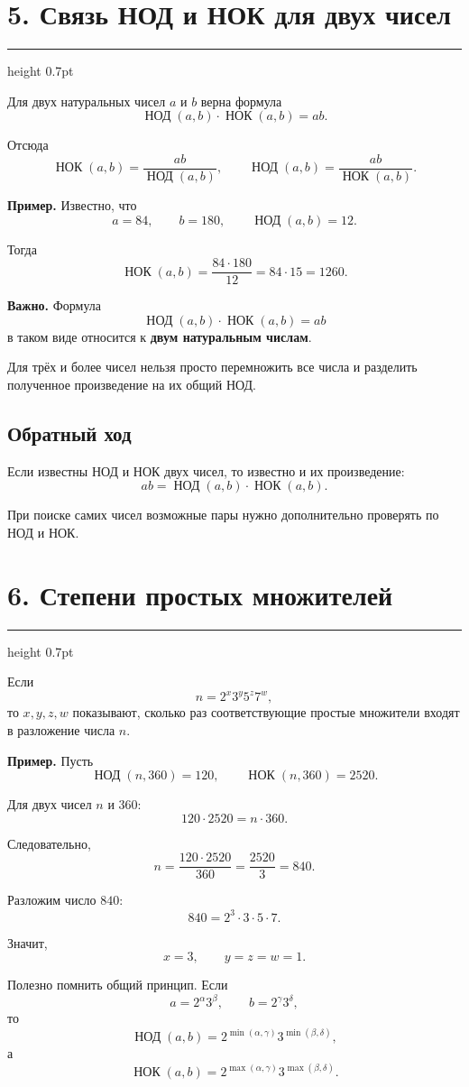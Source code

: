 \documentclass[a4paper,12pt]{article}
\newcommand{\sectionline}{%
  \par\vspace{0.1em}%
  {\color{accent}\hrule height 0.7pt}%
  \vspace{0.55em}}
\newcommand{\GCDru}{\mathop{\text{НОД}}\nolimits}
\newcommand{\LCMru}{\mathop{\text{НОК}}\nolimits}
\begin{document}
\section*{5. Связь НОД и НОК для двух чисел}
\sectionline

Для двух натуральных чисел $a$ и $b$ верна формула
\[
\boxed{
\GCDru(a,b)\cdot\LCMru(a,b)=ab
}.
\]

Отсюда
\[
\LCMru(a,b)
=
\frac{ab}{\GCDru(a,b)},
\qquad
\GCDru(a,b)
=
\frac{ab}{\LCMru(a,b)}.
\]

\textbf{Пример.}
Известно, что
\[
a=84,
\qquad
b=180,
\qquad
\GCDru(a,b)=12.
\]

Тогда
\[
\LCMru(a,b)
=
\frac{84\cdot180}{12}
=
84\cdot15
=
1260.
\]

\textbf{Важно.}
Формула
\[
\GCDru(a,b)\cdot\LCMru(a,b)=ab
\]
в таком виде относится к
\textbf{двум натуральным числам}.

Для трёх и более чисел нельзя
просто перемножить все числа
и разделить полученное произведение
на их общий НОД.

\subsection*{Обратный ход}

Если известны НОД и НОК двух чисел,
то известно и их произведение:
\[
ab
=
\GCDru(a,b)\cdot\LCMru(a,b).
\]

При поиске самих чисел
возможные пары нужно дополнительно проверять
по НОД и НОК.

\section*{6. Степени простых множителей}
\sectionline

Если
\[
n=2^x3^y5^z7^w,
\]
то $x,y,z,w$ показывают,
сколько раз соответствующие простые множители
входят в разложение числа $n$.

\textbf{Пример.}
Пусть
\[
\GCDru(n,360)=120,
\qquad
\LCMru(n,360)=2520.
\]

Для двух чисел $n$ и $360$:
\[
120\cdot2520
=
n\cdot360.
\]

Следовательно,
\[
n
=
\frac{120\cdot2520}{360}
=
\frac{2520}{3}
=
840.
\]

Разложим число $840$:
\[
840
=
2^3\cdot3\cdot5\cdot7.
\]

Значит,
\[
x=3,
\qquad
y=z=w=1.
\]

Полезно помнить общий принцип.
Если
\[
a=2^{\alpha}3^{\beta},
\qquad
b=2^{\gamma}3^{\delta},
\]
то
\[
\GCDru(a,b)
=
2^{\min(\alpha,\gamma)}
3^{\min(\beta,\delta)},
\]
а
\[
\LCMru(a,b)
=
2^{\max(\alpha,\gamma)}
3^{\max(\beta,\delta)}.
\]
\end{document}
